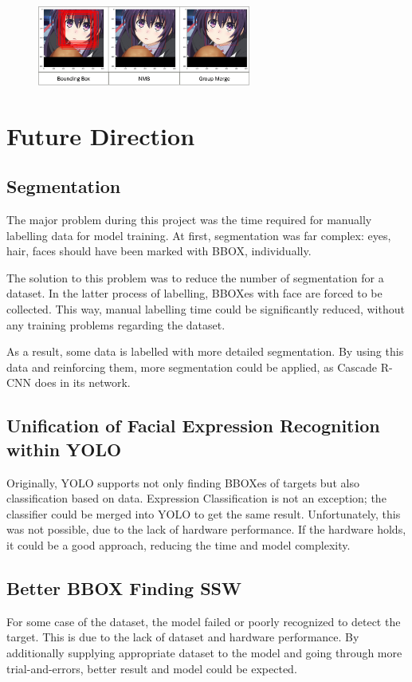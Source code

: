 \documentclass{article}
\begin{document}
\begin{figure}[h]
  \centering
  \includegraphics[width=7cm]{image/GMSvsNMS.png}
\end{figure}

\section{Future Direction}
\subsection{Segmentation}
The major problem during this project was the time required for manually
labelling data for model training. At first, segmentation was far complex: eyes,
hair, faces should have been marked with BBOX, individually.

The solution to this problem was to reduce the number of segmentation for a
dataset. In the latter process of labelling, BBOXes with face are forced to be
collected. This way, manual labelling time could be significantly reduced,
without any training problems regarding the dataset.

As a result, some data is labelled with more detailed segmentation. By using
this data and reinforcing them, more segmentation could be applied, as
Cascade R-CNN does in its network.

\subsection{Unification of Facial Expression Recognition within YOLO}
Originally, YOLO supports not only finding BBOXes of targets but also
classification based on data. Expression Classification is not an exception; the
classifier could be merged into YOLO to get the same result. Unfortunately, this
was not possible, due to the lack of hardware performance. If the hardware
holds, it could be a good approach, reducing the time and model complexity.

\subsection{Better BBOX Finding SSW}
For some case of the dataset, the model failed or poorly recognized to detect
the target. This is due to the lack of dataset and hardware performance. By
additionally supplying appropriate dataset to the model and going through more
trial-and-errors, better result and model could be expected.



\end{document}
